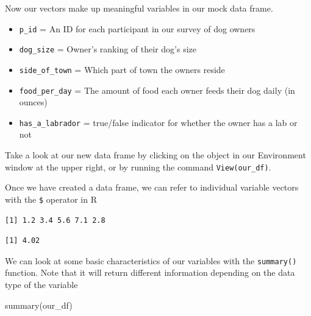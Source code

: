 \documentclass[
  letterpaper,
  DIV=11,
  numbers=noendperiod]{scrreprt}
\newenvironment{Shaded}{\begin{snugshade}}{\end{snugshade}}
\newcommand{\FunctionTok}[1]{\textcolor[rgb]{0.28,0.35,0.67}{#1}}
\newcommand{\NormalTok}[1]{\textcolor[rgb]{0.00,0.23,0.31}{#1}}
\newcommand{\SpecialCharTok}[1]{\textcolor[rgb]{0.37,0.37,0.37}{#1}}
\providecommand{\tightlist}{%
  \setlength{\itemsep}{0pt}\setlength{\parskip}{0pt}}\usepackage{longtable,booktabs,array}
\begin{document}
Now our vectors make up meaningful variables in our mock data frame.

\begin{itemize}
\tightlist
\item
  \texttt{p\_id} = An ID for each participant in our survey of dog
  owners
\item
  \texttt{dog\_size} = Owner's ranking of their dog's size
\item
  \texttt{side\_of\_town} = Which part of town the owners reside
\item
  \texttt{food\_per\_day} = The amount of food each owner feeds their
  dog daily (in ounces)
\item
  \texttt{has\_a\_labrador} = true/false indicator for whether the owner
  has a lab or not
\end{itemize}

Take a look at our new data frame by clicking on the object in our
Environment window at the upper right, or by running the command
\texttt{View(our\_df)}.

Once we have created a data frame, we can refer to individual variable
vectors with the \texttt{\$} operator in R

\begin{Shaded}
\end{Shaded}

\begin{verbatim}
[1] 1.2 3.4 5.6 7.1 2.8
\end{verbatim}

\begin{Shaded}
\end{Shaded}

\begin{verbatim}
[1] 4.02
\end{verbatim}

We can look at some basic characteristics of our variables with the
\texttt{summary()} function. Note that it will return different
information depending on the data type of the variable

\begin{Shaded}
\begin{Highlighting}[]
\FunctionTok{summary}\NormalTok{(our\_df)}
\end{Highlighting}
\end{Shaded}
\end{document}
